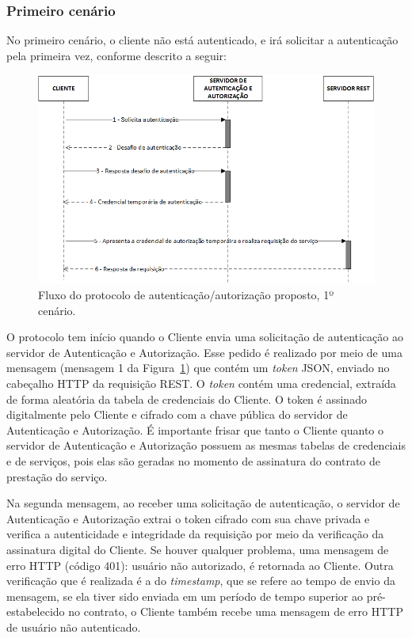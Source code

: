 \subsubsection{Primeiro cenário}
No primeiro cenário, o cliente não está autenticado, e irá solicitar a autenticação pela primeira vez, conforme descrito a seguir:
\newline
\begin{figure}[!htb]
    \centering
    \includegraphics[width=1.0\textwidth]{fluxo_autenticacao.png}
    \caption{Fluxo do protocolo de autenticação/autorização proposto, 1º cenário.}
    \label{fig:protocoloseguro}
\end{figure}


O protocolo tem início quando o Cliente envia uma solicitação de autenticação ao servidor de Autenticação e Autorização. Esse pedido é realizado por meio de uma mensagem (mensagem 1 da Figura~\ref{fig:protocoloseguro}) que contém um \emph{token} JSON, enviado no cabeçalho HTTP da requisição REST. O \emph{token} contém uma credencial, extraída de forma aleatória da tabela de credenciais do Cliente. O token é assinado digitalmente pelo Cliente e cifrado com a chave pública do servidor de Autenticação e Autorização. É importante frisar que tanto o Cliente quanto o servidor de Autenticação e Autorização possuem as mesmas tabelas de credenciais e de serviços, pois elas são geradas no momento de assinatura do contrato de prestação do serviço.

Na segunda mensagem, ao receber uma solicitação de autenticação, o servidor de Autenticação e Autorização extrai o token cifrado com sua chave privada e verifica a autenticidade e integridade da requisição por meio da verificação da assinatura digital do Cliente.  Se houver qualquer problema, uma mensagem de erro HTTP (código 401): usuário não autorizado, é retornada ao Cliente.
Outra verificação que é realizada é a do \emph{timestamp}, que se refere ao tempo de envio da mensagem, se ela tiver sido enviada em um período de tempo superior ao pré-estabelecido no contrato, o Cliente também recebe uma mensagem de erro HTTP de usuário não autenticado.

